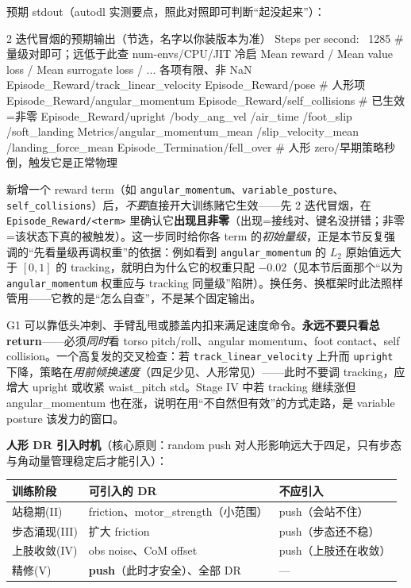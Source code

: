 \noindent{}预期 stdout（autodl 实测要点，照此对照即可判断“起没起来”）：
\begin{codebox}[text]{2 迭代冒烟的预期输出（节选，名字以你装版本为准）}
Steps per second: ~1285        # 量级对即可；远低于此查 num-envs/CPU/JIT 冷启
Mean reward / Mean value loss / Mean surrogate loss / ... 各项有限、非 NaN
Episode_Reward/track_linear_velocity   Episode_Reward/pose            # 人形项
Episode_Reward/angular_momentum        Episode_Reward/self_collisions # 已生效=非零
Episode_Reward/upright  /body_ang_vel  /air_time  /foot_slip  /soft_landing
Metrics/angular_momentum_mean  /slip_velocity_mean  /landing_force_mean
Episode_Termination/fell_over          # 人形 zero/早期策略秒倒，触发它是正常物理
\end{codebox}

\begin{insight}\label{ins:rlmc-hl-smoke}
新增一个 reward term（如 \texttt{angular\_momentum}、\texttt{variable\_posture}、\texttt{self\_collisions}）后，\emph{不要}直接开大训练赌它生效——先 2 迭代冒烟，在 \texttt{Episode\_Reward/<term>} 里确认它\textbf{出现且非零}（出现=接线对、键名没拼错；非零=该状态下真的被触发）。这一步同时给你各 term 的\emph{初始量级}，正是本节反复强调的“先看量级再调权重”的依据：例如看到 \texttt{angular\_momentum} 的 $L_2$ 原始值远大于 $[0,1]$ 的 tracking，就明白为什么它的权重只配 $-0.02$（见本节后面那个“以为 \texttt{angular\_momentum} 权重应与 tracking 同量级”陷阱）。换任务、换框架时此法照样管用——它教的是“怎么自查”，不是某个固定输出。
\end{insight}

\begin{insight}\label{ins:rlmc-hl-rewardhack}
G1 可以靠低头冲刺、手臂乱甩或膝盖内扣来满足速度命令。\textbf{永远不要只看总 return}——必须\emph{同时}看 torso pitch/roll、angular momentum、foot contact、self collision。一个高复发的交叉检查：若 \texttt{track\_linear\_velocity} 上升而 \texttt{upright} 下降，策略在\emph{用前倾换速度}（四足少见、人形常见）——此时不要调 tracking，应增大 upright 或收紧 waist\_pitch std。Stage IV 中若 tracking 继续涨但 angular\_momentum 也在涨，说明在用“不自然但有效”的方式走路，是 variable posture 该发力的窗口。
\end{insight}

\textbf{人形 DR 引入时机}（核心原则：random push 对人形影响远大于四足，只有步态与角动量管理稳定后才能引入）：

\begin{center}
\small
\begin{tabular}{lll}
\hline
训练阶段 & 可引入的 DR & 不应引入 \\
\hline
站稳期(II) & friction、motor\_strength（小范围） & push（会站不住） \\
步态涌现(III) & 扩大 friction & push（步态还不稳） \\
上肢收敛(IV) & obs noise、CoM offset & push（上肢还在收敛） \\
精修(V) & \textbf{push}（此时才安全）、全部 DR & --- \\
\hline
\end{tabular}
\end{center}

